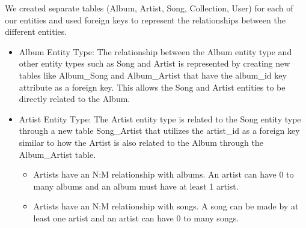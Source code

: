 \documentclass[12pt]{article}
\begin{document}
    \vspace{0.5cm}

    \noindent We created separate tables (Album, Artist, Song, Collection, User) for each of our
    entities and used foreign keys to represent the relationships between the different entities.
    \begin{itemize}
        \item Album Entity Type: The relationship between the Album entity type and other entity types such as Song and Artist is represented by creating new tables like Album\_Song and Album\_Artist that have the album\_id key attribute as a foreign key. This allows the Song and Artist entities to be directly related to the Album.
        \item Artist Entity Type: The Artist entity type is related to the Song entity type through a new table Song\_Artist that utilizes the artist\_id as a foreign key similar to how the Artist is also related to the Album through the Album\_Artist table.
            \begin{itemize}
                \item Artists have an N:M relationship with albums. An artist can have 0 to many albums and an album must have at least 1 artist.
                \item Artists have an N:M relationship with songs. A song can be made by at least one artist and an artist can have 0 to many songs.


\end{itemize}
\end{itemize}
\end{document}
